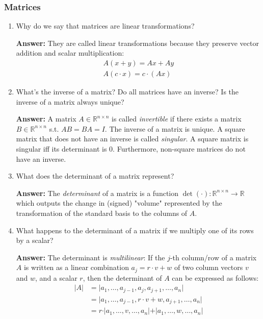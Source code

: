 \documentclass{article}
\newenvironment{QandA}{\begin{enumerate}[label=\arabic*.]}{\end{enumerate}}
\newenvironment{answer}{\par\normalfont \textbf{Answer:}}{}
\newcommand{\R}{\mathbb{R}}
\begin{document}
\subsubsection{Matrices}
\begin{QandA}
    \item Why do we say that matrices are linear transformations?
    \begin{answer}
        They are called linear transformations because they preserve vector addition and scalar multiplication:
        \begin{align*}
            A(x+y) = Ax + Ay \\
            A(c \cdot x) = c \cdot (Ax)
        \end{align*}
    \end{answer}
    
    \item What’s the inverse of a matrix? Do all matrices have an inverse? Is the inverse of a matrix always unique?
    \begin{answer}
        A matrix $A \in \R^{n \times n}$ is called \textit{invertible} if there exists a matrix $B \in \R^{n \times n}$ s.t. $AB = BA = I$. The inverse of a matrix is unique. A square matrix that does not have an inverse is called \textit{singular}. A square matrix is singular iff its determinant is 0. Furthermore, non-square matrices do not have an inverse.
    \end{answer}
    
    \item What does the determinant of a matrix represent?
    \begin{answer}
        The \textit{determinant} of a matrix is a function $\det(\cdot): \R^{n \times n} \rightarrow \R$ which outputs the change in (signed) "volume" represented by the transformation of the standard basis to the columns of $A$.
    \end{answer}
    
    \item What happens to the determinant of a matrix if we multiply one of its rows by a scalar?
    \begin{answer}
        The determinant is \textit{multilinear}: If the $j$-th column/row of a matrix $A$ is written as a linear combination $a_j = r \cdot v + w$ of two column vectors $v$ and $w$, and a scalar $r$, then the determinant of $A$ can be expressed as follows:
        \begin{align*}
            \vert A \vert &= \vert a_1, \ldots, a_{j-1}, a_j, a_{j+1}, \ldots, a_n \vert \\
            &= \vert a_1, \ldots, a_{j-1}, r \cdot v + w, a_{j+1}, \ldots, a_n \vert \\
            &= r \cdot \vert a_1, \ldots, v, \ldots, a_n \vert + \vert a_1, \ldots, w, \ldots, a_n \vert 
        \end{align*}
    \end{answer}
    

\end{QandA}
\end{document}
